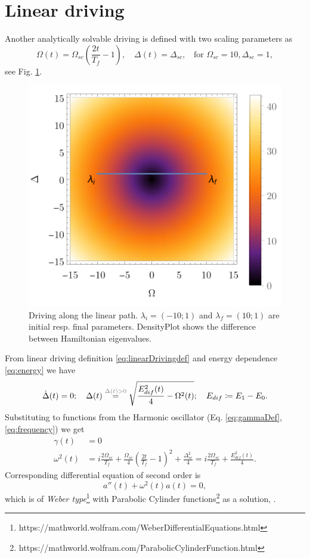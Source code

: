 \newpage 
\section{Linear driving}
Another analytically solvable driving is defined with two scaling parameters as 
\begin{equation}
    \Omega(t)=\Omega_{sc}\left(\frac{2t}{T_f}-1\right),\quad \Delta(t)=\Delta_{sc}, \;\;\text{ for } \Omega_{sc}=10, \Delta_{sc}=1,
    \label{eq:linearDrivingdef}
\end{equation}
see Fig. \ref{fig:driving}. 
\begin{figure}[H]
    \centering
    \includegraphics[scale=1.2]{../img/drivingLin.pdf}
    \caption{Driving along the linear path. $\lambda_i=(-10;1)$ and $\lambda_f=(10;1)$ are initial resp. final parameters. DensityPlot shows the difference between Hamiltonian eigenvalues.}
    \label{fig:driving}
\end{figure}

From linear driving definition \ref{eq:linearDrivingdef} and energy dependence \ref{eq:energy} we have
\begin{equation}
    \dot \Delta(t)=0;\quad \Delta(t) \overset{\textcolor{gray}{\Delta(t)>0}}{=} \sqrt{\frac{E^2_{dif}(t)}{4}-\Omega^2(t)};\quad E_{dif}\coloneqq E_1-E_0.
\end{equation}
Substituting to functions from the Harmonic oscillator (Eq. \ref{eq:gammaDef}, \ref{eq:frequency}) we get 
\begin{align}
    \gamma(t) &= 0\\
    \omega^2(t)&=i\frac{2\Omega_{sc}}{T_f}+\frac{\Omega_{sc}}{4}\left(\frac{2t}{T_f}-1\right)^2+\frac{\Delta_{sc}^2}{4}=i\frac{2\Omega_{sc}}{T_f}+\frac{E^2_{dif}(t)}{4}.
    \label{eq:oscillationsLinear}
\end{align}
Corresponding differential equation of second order is
\begin{equation}
    a''(t)+\omega^2(t) a(t)=0,
\end{equation}
which is of \emph{Weber type}\footnote{https://mathworld.wolfram.com/WeberDifferentialEquations.html} with Parabolic Cylinder functions\footnote{https://mathworld.wolfram.com/ParabolicCylinderFunction.html} as a solution, . 

